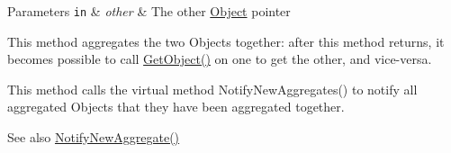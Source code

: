 \begin{DoxyParams}[1]{Parameters}
\mbox{\tt in}  & {\em other} & The other \hyperlink{classns3_1_1Object}{Object} pointer\\
\hline
\end{DoxyParams}
This method aggregates the two Objects together\+: after this method returns, it becomes possible to call \hyperlink{classns3_1_1Object_a13e18c00017096c8381eb651d5bd0783}{Get\+Object()} on one to get the other, and vice-\/versa.

This method calls the virtual method Notify\+New\+Aggregates() to notify all aggregated Objects that they have been aggregated together.

\begin{DoxySeeAlso}{See also}
\hyperlink{classns3_1_1Object_a1bd7211125185a6cd511c35fea4e500f}{Notify\+New\+Aggregate()} 
\end{DoxySeeAlso}

